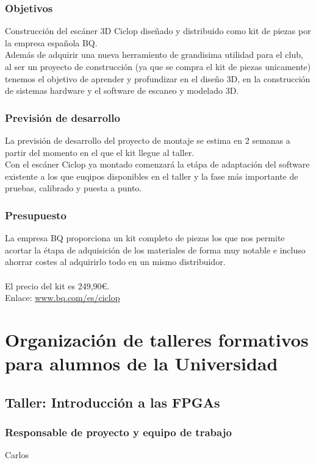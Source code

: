 \documentclass[12pt,twoside]{report}
\begin{document}
\subsubsection{Objetivos}
Construcción del escáner 3D Ciclop diseñado y distribuido como kit de piezas por la empresa española BQ.\\
Además de adquirir una nueva herramiento de grandisima utilidad para el club, al ser un proyecto de construcción (ya que se compra el kit de piezas unicamente) tenemos el objetivo de aprender y profundizar en el diseño 3D, en la construcción de sistemas hardware y el software de escaneo y modelado 3D.

\subsubsection{Previsión de desarrollo}
La previsión de desarrollo del proyecto de montaje se estima en 2 semanas a partir del momento en el que el kit llegue al taller.\\
Con el escáner Ciclop ya montado comenzará la etápa de adaptación del software existente a los que euqipos disponibles en el taller y la fase más importante de pruebas, calibrado y puesta a punto.
\subsubsection{Presupuesto}
La empresa BQ proporciona un kit completo de piezas los que nos permite acortar la étapa de adquisición de los materiales de forma muy notable e incluso ahorrar costes al adquirirlo todo en un mismo distribuidor. \\
\\
El precio del kit es 249,90\euro{}.\\
Enlace: \url{www.bq.com/es/ciclop}

\section{Organización de talleres formativos para alumnos de la Universidad}

\subsection{Taller: Introducción a las FPGAs}
\subsubsection{Responsable de proyecto y equipo de trabajo}
Carlos
\end{document}
